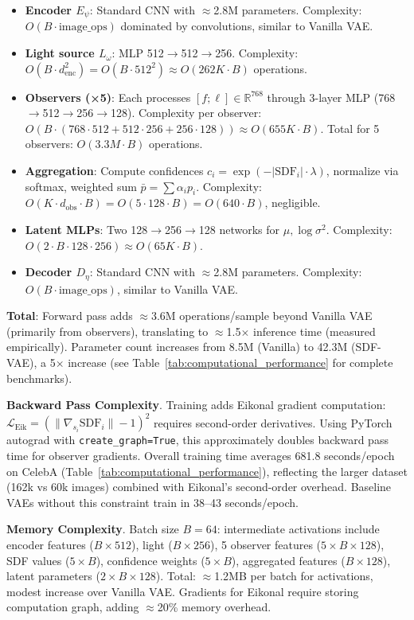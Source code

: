 \documentclass[10pt,twocolumn,letterpaper]{article}
\begin{document}
\begin{itemize}
\item \textbf{Encoder $E_\psi$}: Standard CNN with $\approx$2.8M parameters. Complexity: $O(B \cdot \text{image\_ops})$ dominated by convolutions, similar to Vanilla VAE.
\item \textbf{Light source $L_\omega$}: MLP 512$\to$512$\to$256. Complexity: $O(B \cdot d_{\text{enc}}^2) = O(B \cdot 512^2) \approx O(262K \cdot B)$ operations.
\item \textbf{Observers (×5)}: Each processes $[f; \ell] \in \mathbb{R}^{768}$ through 3-layer MLP (768$\to$512$\to$256$\to$128). Complexity per observer: $O(B \cdot (768 \cdot 512 + 512 \cdot 256 + 256 \cdot 128)) \approx O(655K \cdot B)$. Total for 5 observers: $O(3.3M \cdot B)$ operations.
\item \textbf{Aggregation}: Compute confidences $c_i = \exp(-|\text{SDF}_i| \cdot \lambda)$, normalize via softmax, weighted sum $\bar{p} = \sum \alpha_i p_i$. Complexity: $O(K \cdot d_{\text{obs}} \cdot B) = O(5 \cdot 128 \cdot B) = O(640 \cdot B)$, negligible.
\item \textbf{Latent MLPs}: Two 128$\to$256$\to$128 networks for $\mu, \log \sigma^2$. Complexity: $O(2 \cdot B \cdot 128 \cdot 256) \approx O(65K \cdot B)$.
\item \textbf{Decoder $D_\eta$}: Standard CNN with $\approx$2.8M parameters. Complexity: $O(B \cdot \text{image\_ops})$, similar to Vanilla VAE.
\end{itemize}

\textbf{Total}: Forward pass adds $\approx$3.6M operations/sample beyond Vanilla VAE (primarily from observers), translating to $\approx$1.5$\times$ inference time (measured empirically). Parameter count increases from 8.5M (Vanilla) to 42.3M (SDF-VAE), a 5$\times$ increase (see Table~\ref{tab:computational_performance} for complete benchmarks).

\textbf{Backward Pass Complexity}. Training adds Eikonal gradient computation: $\mathcal{L}_{\text{Eik}} = (\|\nabla_{s_i} \text{SDF}_i\| - 1)^2$ requires second-order derivatives. Using PyTorch autograd with \texttt{create\_graph=True}, this approximately doubles backward pass time for observer gradients. Overall training time averages 681.8 seconds/epoch on CelebA (Table~\ref{tab:computational_performance}), reflecting the larger dataset (162k vs 60k images) combined with Eikonal's second-order overhead. Baseline VAEs without this constraint train in 38--43 seconds/epoch.

\textbf{Memory Complexity}. Batch size $B=64$: intermediate activations include encoder features ($B \times 512$), light ($B \times 256$), 5 observer features ($5 \times B \times 128$), SDF values ($5 \times B$), confidence weights ($5 \times B$), aggregated features ($B \times 128$), latent parameters ($2 \times B \times 128$). Total: $\approx$1.2MB per batch for activations, modest increase over Vanilla VAE. Gradients for Eikonal require storing computation graph, adding $\approx$20\% memory overhead.
\end{document}

